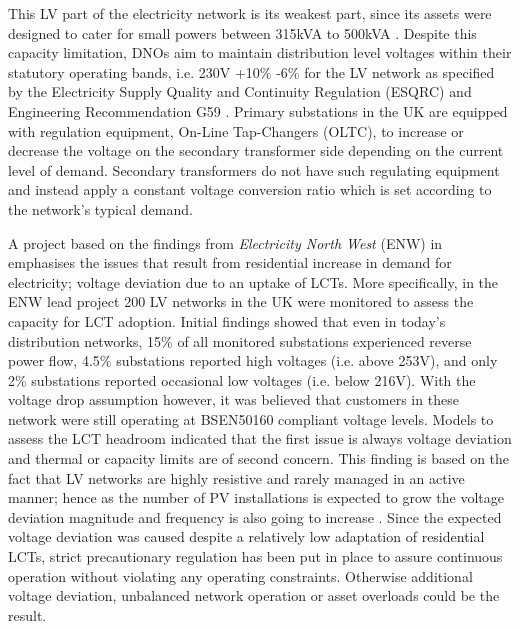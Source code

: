 This LV part of the electricity network is its weakest part, since its assets were designed to cater for small powers between 315kVA to 500kVA \cite{EDS08-0115}.
Despite this capacity limitation, DNOs aim to maintain distribution level voltages within their statutory operating bands, i.e. 230V +10\% -6\% for the LV network as specified by the Electricity Supply Quality and Continuity Regulation (ESQRC) \cite{HealthandSafetyExecutive2002} and Engineering Recommendation G59 \cite{EnergyNetworksAssociation2013}.
Primary substations in the UK are equipped with regulation equipment,  On-Line Tap-Changers (OLTC), to increase or decrease the voltage on the secondary transformer side depending on the current level of demand.
Secondary transformers do not have such regulating equipment and instead apply a constant voltage conversion ratio which is set according to the network's typical demand.

A project based on the findings from \textit{Electricity North West} (ENW) in \cite{ElectricityNorthWestLtd2014} emphasises the issues that result from residential increase in demand for electricity;  voltage deviation due to an uptake of LCTs.
More specifically, in the ENW lead project 200 LV networks in the UK were monitored to assess the capacity for LCT adoption.
Initial findings showed that even in today's distribution networks, 15\% of all monitored substations experienced reverse power flow, 4.5\% substations reported high voltages (i.e. above 253V), and only 2\% substations reported occasional low voltages (i.e. below 216V).
With the voltage drop assumption however, it was believed that customers in these network were still operating at BSEN50160 compliant voltage levels.
Models to assess the LCT headroom indicated that the first issue is always voltage deviation and thermal or capacity limits are of second concern.
This finding is based on the fact that LV networks are highly resistive and rarely managed in an active manner; hence as the number of PV installations is expected to grow the voltage deviation magnitude and frequency is also going to increase \cite{Woyte2006}.
Since the expected voltage deviation was caused despite a relatively low adaptation of residential LCTs, strict precautionary regulation has been put in place to assure continuous operation without violating any operating constraints.
Otherwise additional voltage deviation, unbalanced network operation or asset overloads could be the result.

